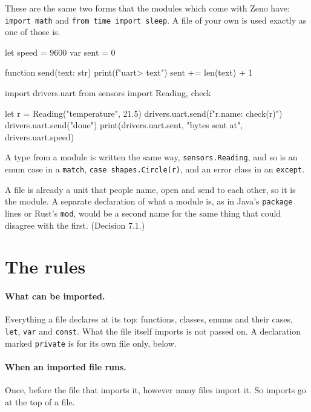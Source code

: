 These are the same two forms that the modules which come with Zeno
have: \verb|import math| and \verb|from time import sleep|. A file of
your own is used exactly as one of those is.

\begin{zeno}[file=drivers/uart.zeno, dir=station, run=no]
let speed = 9600
var sent = 0

function send(text: str) {
    print(f"uart> {text}")
    sent += len(text) + 1
}
\end{zeno}

\begin{zeno}[file=station.zeno, dir=station]
import drivers.uart
from sensors import Reading, check

let r = Reading("temperature", 21.5)
drivers.uart.send(f"{r.name}: {check(r)}")
drivers.uart.send("done")
print(drivers.uart.sent, "bytes sent at", drivers.uart.speed)
\end{zeno}

A type from a module is written the same way, \verb|sensors.Reading|,
and so is an enum case in a \verb|match|, \verb|case shapes.Circle(r)|,
and an error class in an \verb|except|.

\begin{why}
A file is already a unit that people name, open and send to each
other, so it is the module. A separate declaration of what a module
is, as in Java's \verb|package| lines or Rust's \verb|mod|, would be a
second name for the same thing that could disagree with the first.
(Decision 7.1.)
\end{why}

\section{The rules}

\paragraph{What can be imported.} Everything a file declares at its
top: functions, classes, enums and their cases, \verb|let|,
\verb|var| and \verb|const|. What the file itself imports is not
passed on. A declaration marked \verb|private| is for its own file
only, below.

\paragraph{When an imported file runs.} Once, before the file that
imports it, however many files import it. So imports go at the top
of a file.

